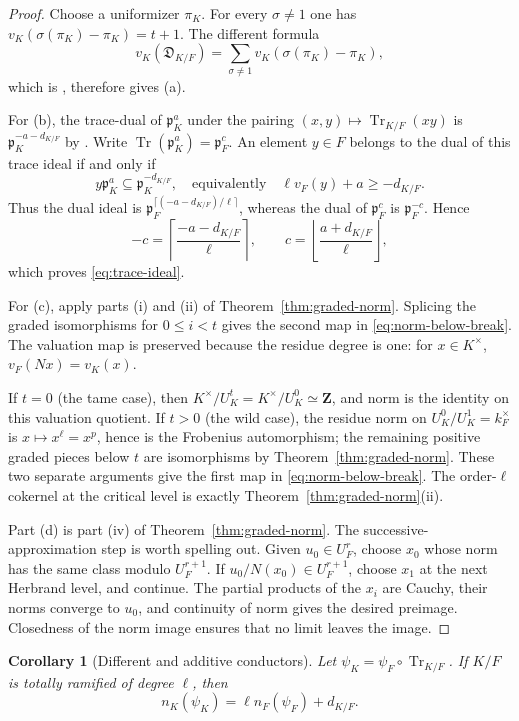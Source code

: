 \documentclass[11pt]{amsart}
\newtheorem{corollary}[theorem]{Corollary}
\theoremstyle{definition}
\theoremstyle{remark}
\newcommand{\p}{\mathfrak p}
\newcommand{\Tr}{\operatorname{Tr}}
\begin{document}
\begin{proof}
Choose a uniformizer $\pi_K$.  For every $\sigma\ne1$ one has
$v_K(\sigma(\pi_K)-\pi_K)=t+1$.  The different formula
\[
 v_K(\mathfrak D_{K/F})
 =\sum_{\sigma\ne1}v_K(\sigma(\pi_K)-\pi_K),
\]
which is \cite[Chapter~IV, \S1, Proposition~4]{Serre}, therefore gives
(a).

For (b), the trace-dual of $\p_K^a$ under the pairing
$(x,y)\mapsto\Tr_{K/F}(xy)$ is $\p_K^{-a-d_{K/F}}$ by
\cite[Chapter~III, \S3, Proposition~7]{Serre}.  Write
$\Tr(\p_K^a)=\p_F^c$.  An element $y\in F$ belongs to the dual of this
trace ideal if and only if
\[
 y\p_K^a\subseteq\p_K^{-d_{K/F}},
 \quad\text{equivalently}\quad
 \ell v_F(y)+a\ge-d_{K/F}.
\]
Thus the dual ideal is
$\p_F^{\lceil(-a-d_{K/F})/\ell\rceil}$, whereas the dual of
$\p_F^c$ is $\p_F^{-c}$.  Hence
\[
 -c=\left\lceil\frac{-a-d_{K/F}}{\ell}\right\rceil,
 \qquad
 c=\left\lfloor\frac{a+d_{K/F}}{\ell}\right\rfloor,
\]
which proves \eqref{eq:trace-ideal}.

For (c), apply parts (i) and (ii) of
Theorem~\ref{thm:graded-norm}.  Splicing the graded
isomorphisms for $0\le i<t$ gives the second map in
\eqref{eq:norm-below-break}.  The valuation map is preserved because
the residue degree is one: for $x\in K^\times$,
$v_F(Nx)=v_K(x)$.

If $t=0$ (the tame case), then
$K^\times/U_K^t=K^\times/U_K^0\simeq\mathbf Z$, and norm is the identity
on this valuation quotient.  If $t>0$ (the wild case), the residue norm
on $U_K^0/U_K^1=k_F^\times$ is $x\mapsto x^\ell=x^p$, hence is the
Frobenius automorphism; the remaining positive graded pieces below $t$
are isomorphisms by Theorem~\ref{thm:graded-norm}.  These two separate arguments give
the first map in \eqref{eq:norm-below-break}.  The order-$\ell$ cokernel
at the critical level is exactly Theorem~\ref{thm:graded-norm}(ii).

Part (d) is part (iv) of Theorem~\ref{thm:graded-norm}.
The successive-approximation step is worth spelling out.  Given
$u_0\in U_F^r$, choose $x_0$ whose norm has the same class modulo
$U_F^{r+1}$.  If
$u_0/N(x_0)\in U_F^{r+1}$, choose $x_1$ at the next Herbrand level,
and continue.  The partial products of the $x_i$ are Cauchy, their
norms converge to $u_0$, and continuity of norm gives the desired
preimage.  Closedness of the norm image ensures that no limit leaves
the image.
\end{proof}

\begin{corollary}[Different and additive conductors]\label{cor:additive-conductor}
Let $\psi_K=\psi_F\circ\Tr_{K/F}$.  If $K/F$ is totally ramified of
degree $\ell$, then
\begin{equation}\label{eq:additive-conductor-trace}
 n_K(\psi_K)=\ell n_F(\psi_F)+d_{K/F}.
\end{equation}
\end{corollary}
\end{document}
